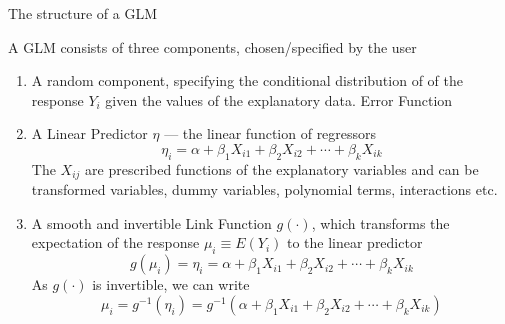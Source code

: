 \documentclass[10pt,ignorenonframetext,compress, aspectratio=169]{beamer}
\providecommand{\tightlist}{%
  \setlength{\itemsep}{0pt}\setlength{\parskip}{0pt}}
\begin{document}
\begin{frame}{The structure of a GLM}

A GLM consists of three components, chosen/specified by the user

\begin{enumerate}
\def\labelenumi{\arabic{enumi}.}
\tightlist
\item
  A random component, specifying the conditional distribution of of the
  response \(Y_i\) given the values of the explanatory data.
  \alert{Error Function}
\item
  A \alert{Linear Predictor} \(\eta\) --- the linear function of
  regressors
  \[\eta_i = \alpha + \beta_1 X_{i1} + \beta_2 X_{i2} + \cdots + \beta_k X_{ik}\]
  The \(X_{ij}\) are prescribed functions of the explanatory variables
  and can be transformed variables, dummy variables, polynomial terms,
  interactions etc.
\item
  A smooth and invertible \alert{Link Function} \(g(\cdot)\), which
  transforms the expectation of the response \(\mu_i \equiv E(Y_i)\) to
  the linear predictor
  \[g(\mu_i) = \eta_i = \alpha + \beta_1 X_{i1} + \beta_2 X_{i2} + \cdots + \beta_k X_{ik}\]
  As \(g(\cdot)\) is invertible, we can write
  \[\mu_i = g^{-1}(\eta_i) = g^{-1}(\alpha + \beta_1 X_{i1} + \beta_2 X_{i2} + \cdots + \beta_k X_{ik})\]
\end{enumerate}

\end{frame}
\end{document}
